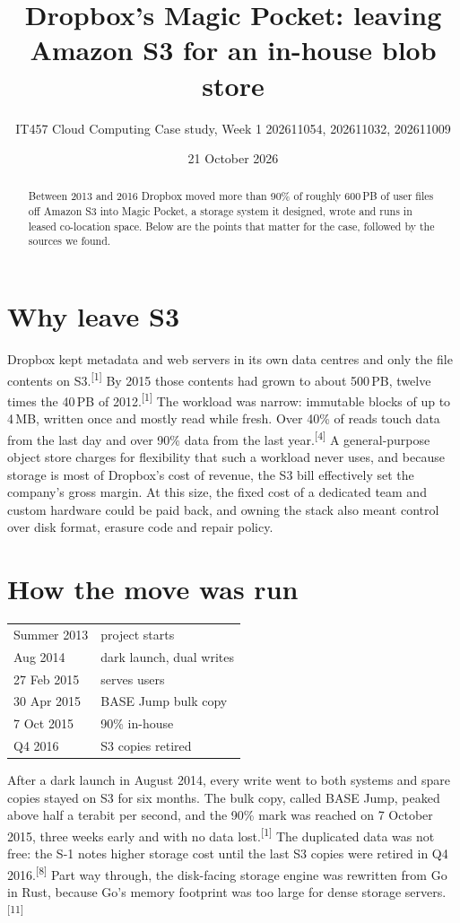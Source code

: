 \documentclass[a4paper,justified,nobib]{tufte-handout}
\title[Dropbox Magic Pocket, Week 1]{Dropbox's Magic Pocket: leaving Amazon S3 for an in-house blob store}
\author[IT457 Case Study]{IT457 Cloud Computing \textperiodcentered{} Case study, Week 1 \textperiodcentered{} 202611054, 202611032, 202611009}
\date{21 October 2026}
\DeclareRobustCommand{\cite}[1]{\textsuperscript{[#1]}}
\begin{document}
\maketitle

\begin{abstract}
\noindent Between 2013 and 2016 Dropbox moved more than 90\% of roughly 600\,PB of user files
off Amazon S3 into Magic Pocket, a storage system it designed, wrote and runs in leased
co-location space. Below are the points that matter for the case, followed by the sources we found.
\end{abstract}

\section{Why leave S3}

 Dropbox kept metadata and web servers in its own data centres
and only the file contents on S3.\cite{1} By 2015 those contents had grown to about 500\,PB,
twelve times the 40\,PB of 2012.\cite{1} The workload was narrow: immutable blocks of up to
4\,MB, written once and mostly read while fresh. Over 40\% of reads touch data from the last
day and over 90\% data from the last year.\cite{4} A general-purpose object store charges for
flexibility that such a workload never uses, and because storage is most of Dropbox's cost of
revenue, the S3 bill effectively set the company's gross margin. At this size, the fixed cost
of a dedicated team and custom hardware could be paid back, and owning the stack also meant
control over disk format, erasure code and repair policy.

\section{How the move was run}

\begin{margintable}
\footnotesize
\begin{tabular}{@{}l@{\quad}l@{}}
\toprule
Summer 2013 & project starts \\
Aug 2014 & dark launch, dual writes \\
27 Feb 2015 & serves users \\
30 Apr 2015 & BASE Jump bulk copy \\
7 Oct 2015 & 90\% in-house \\
Q4 2016 & S3 copies retired \\
\bottomrule
\end{tabular}
\caption{Migration timeline.\cite{1,8}}
\end{margintable}
After a dark launch in August 2014, every write went to both systems and spare copies stayed
on S3 for six months. The bulk copy, called BASE Jump, peaked above half a terabit per
second, and the 90\% mark was reached on 7 October 2015, three weeks early and with no data
lost.\cite{1} The duplicated data was not free: the S-1 notes higher storage cost until the
last S3 copies were retired in Q4 2016.\cite{8} Part way through, the disk-facing storage
engine was rewritten from Go in Rust, because Go's memory footprint was too large for dense
storage servers.\cite{11}
\end{document}
